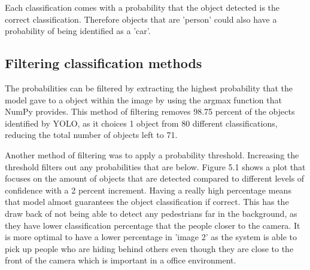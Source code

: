 \documentclass[12pt]{report}
\begin{document}
\vspace{2mm}

Each classification comes with a probability that the object detected is the correct classification. Therefore objects that are 'person' could also have a probability of being identified as a 'car'.

\subsection{Filtering classification methods}

The probabilities can be filtered by extracting the highest probability that the model gave to a object within the image by using the argmax function that NumPy provides. This method of filtering removes 98.75 percent of the objects identified by YOLO, as it choices 1 object from 80 different classifications, reducing the total number of objects left to 71.

\vspace{2mm}

Another method of filtering was to apply a probability threshold. Increasing the threshold filters out any probabilities that are below. Figure 5.1 shows a plot that focuses on the amount of objects that are detected compared to different levels of confidence with a 2 percent increment. Having a really high percentage means that model almost guarantees the object classification if correct. This has the draw back of not being able to detect any pedestrians far in the background, as they have lower classification percentage that the people closer to the camera. It is more optimal to have a lower percentage in 'image 2' as the system is able to pick up people who are hiding behind others even though they are close to the front of the camera which is important in a office environment.
\end{document}
